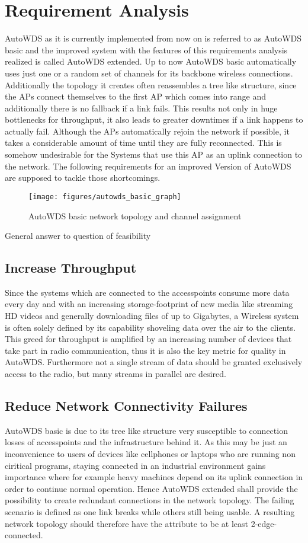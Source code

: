 \chapter{Requirement Analysis}
  AutoWDS as it is currently implemented from now on is referred to as AutoWDS basic and the improved system with the features of this requirements analysis realized 
  is called AutoWDS extended.
  Up to now AutoWDS basic automatically uses just one or a random set of channels for its backbone wireless connections. 
  Additionally the topology it creates often reassembles a tree like structure, since the APs connect themselves 
  to the first AP which comes into range and additionally there is no fallback if a link fails. This results not only in huge bottlenecks for throughput,
  it also leads to greater downtimes if a link happens to actually fail. Although the APs automatically rejoin the network if possible, it takes
  a considerable amount of time until they are fully reconnected. This is somehow undesirable for the Systems that use this AP as an uplink connection to
  the network. The following requirements for an improved Version of AutoWDS are supposed to tackle those shortcomings.
  \begin{figure}[t]
    \centering
    \texttt{[image: figures/autowds\_basic\_graph]}
    \caption{AutoWDS basic network topology and channel assignment}
    \label{fig:autowds_basic_graph}
  \end{figure}
General answer to question of feasibility
  \section{Increase Throughput}
  Since the systems which are connected to the accesspoints consume more data every day and with an increasing storage-footprint of new media like streaming HD videos
  and generally downloading files of up to Gigabytes, a Wireless system is often solely defined by its capability shoveling data over the air to the clients.
  This greed for throughput is amplified by an increasing number of devices that take part in radio communication, 
  thus it is also the key metric for quality in AutoWDS. Furthermore not a single stream of data should be granted exclusively access to the radio, but
  many streams in parallel are desired.
  \section{Reduce Network Connectivity Failures}
  AutoWDS basic is due to its tree like structure very susceptible to connection losses of accesspoints and the infrastructure behind it.
  As this may be just an inconvenience to users of devices like cellphones or laptops who are running non ciritical programs, 
  staying connected in an industrial environment gains importance where for example heavy machines depend on its uplink connection in order 
  to continue normal operation. Hence AutoWDS extended shall provide the possibility to create 
  redundant connections in the network topology. The failing scenario is defined as one link breaks while others still being usable.
  A resulting network topology should therefore have the attribute to be at least 2-edge-connected.
